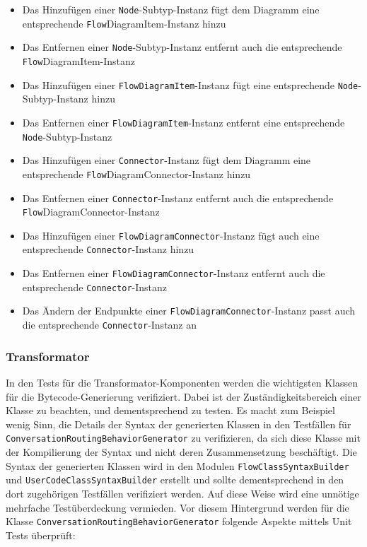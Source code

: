 \begin{itemize}
\item Das Hinzufügen einer \texttt{Node}-Subtyp-Instanz fügt dem Diagramm eine entsprechende \texttt{Flow}\-Diagram\-Item-In\-stanz hinzu
\item Das Entfernen einer \texttt{Node}-Subtyp-Instanz entfernt auch die entsprechende \texttt{Flow}\-Diagram\-Item-In\-stanz
\item Das Hinzufügen einer \texttt{FlowDiagramItem}-Instanz fügt eine entsprechende \texttt{Node}-Subtyp-Instanz hinzu
\item Das Entfernen einer \texttt{FlowDiagramItem}-Instanz entfernt eine entsprechende \texttt{Node}-Subtyp-Instanz
\item Das Hinzufügen einer \texttt{Connector}-Instanz fügt dem Diagramm eine entsprechende \texttt{Flow}\-Dia\-gram\-Con\-nec\-tor-In\-stanz hinzu
\item Das Entfernen einer \texttt{Connector}-Instanz entfernt auch die entsprechende \texttt{Flow}\-Dia\-gram\-Con\-nec\-tor-In\-stanz
\item Das Hinzufügen einer \texttt{FlowDiagramConnector}-Instanz fügt auch eine entsprechende \texttt{Connector}-Instanz hinzu
\item Das Entfernen einer \texttt{FlowDiagramConnector}-Instanz entfernt auch die entsprechende \texttt{Connector}-Instanz
\item Das Ändern der Endpunkte einer \texttt{FlowDiagramConnector}-Instanz passt auch die entsprechende \texttt{Connector}-Instanz an
\end{itemize} 

\subsubsection{Transformator}  
In den Tests für die Transformator-Komponenten werden die wichtigsten Klassen für die Bytecode-Generierung verifiziert. Dabei ist der Zuständigkeitsbereich einer Klasse zu beachten, und dementsprechend zu testen. Es macht zum Beispiel wenig Sinn, die Details der Syntax der generierten Klassen in den Testfällen für \texttt{ConversationRoutingBehaviorGenerator} zu verifizieren, da sich diese Klasse mit der Kompilierung der Syntax und nicht deren Zusammensetzung beschäftigt. Die Syntax der generierten Klassen wird in den Modulen \texttt{FlowClassSyntaxBuilder} und \texttt{UserCodeClassSyntaxBuilder} erstellt und sollte dementsprechend in den dort zugehörigen Testfällen verifiziert werden. Auf diese Weise wird eine unnötige mehrfache Testüberdeckung vermieden. Vor diesem Hintergrund werden für die Klasse \texttt{ConversationRoutingBehaviorGenerator} folgende Aspekte mittels Unit Tests überprüft: 

